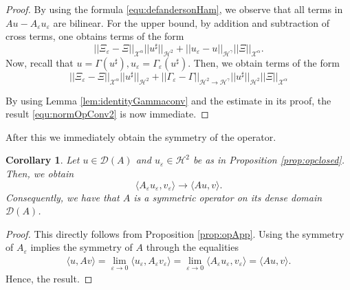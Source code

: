 \documentclass[11pt, oneside]{article}   	%
\newtheorem{corollary}[theorem]{Corollary}
\begin{document}
\begin{proof}
By using the formula \ref{equ:defandersonHam}, we observe that all terms in $Au  - A_\varepsilon u_\varepsilon$ are bilinear.  For the upper bound, by addition and subtraction of cross terms, one obtains terms of the form
\begin{equation} \label{equ:normOpconv4}
||\Xi_\varepsilon - \Xi||_{\mathscr{X}^\alpha} ||u^\sharp||_{\mathscr{H}^2} + ||u_\varepsilon - u||_{\mathscr{H}^\gamma} ||\Xi||_{\mathscr{X}^\alpha}.
\end{equation}
Now, recall that $u = \Gamma (u^\sharp), u_\varepsilon = \Gamma_\varepsilon (u^\sharp)$.  Then, we obtain terms of the form
\begin{equation} \label{equ:normOpconv4}
||\Xi_\varepsilon - \Xi||_{\mathscr{X}^\alpha} ||u^\sharp||_{\mathscr{H}^2} + ||\Gamma_\varepsilon - \Gamma||_{\mathscr{H}^2 \rightarrow\mathscr{H}^\gamma} ||u^\sharp||_{\mathscr{H}^2} ||\Xi||_{\mathscr{X}^\alpha} 
\end{equation}

By using Lemma \ref{lem:identityGammaconv} and the estimate in its proof, the result  \eqref{equ:normOpConv2} is now immediate.


\end{proof}

After this we immediately obtain the symmetry of the operator.

\begin{corollary}
	Let $u \in \mathscr{D}(A)$ and  $u_\varepsilon \in \mathscr{H}^2$ be as in Proposition \ref{prop:opclosed}. Then, we obtain
	\begin{equation}\label{equ:formapp}
	\langle A_\varepsilon u_\varepsilon, v_\varepsilon \rangle \rightarrow \langle A u, v \rangle.
	\end{equation}
	Consequently, we have that $A$ is a symmetric operator on its dense domain $\mathscr{D}(A)$.
\end{corollary}
\begin{proof}
This directly follows from Proposition \ref{prop:opApp}.  Using the  symmetry of $A_\varepsilon$ implies the symmetry of $A$ through the equalities
\begin{align*}
\langle u,Av\rangle=\lim\limits_{\varepsilon\to0}\langle u_\varepsilon,A_\varepsilon v_\varepsilon\rangle=\lim\limits_{\varepsilon\to0}\langle A_\varepsilon u_\varepsilon, v_\varepsilon\rangle=\langle Au,v\rangle.
\end{align*}
Hence, the result.
\end{proof}
\end{document}
